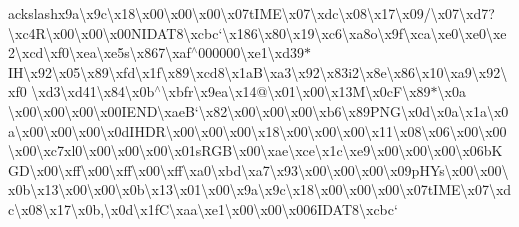ackslash{}x9a\textbackslash{}x9c\textbackslash{}x18\textbackslash{}x00\textbackslash{}x00\textbackslash{}x00\textbackslash{}x07t\+I\+M\+E\textbackslash{}x07\textbackslash{}xdc\textbackslash{}x08\textbackslash{}x17\textbackslash{}x09/\textbackslash{}x07\textbackslash{}xd7?\textbackslash{}xc4\+R\textbackslash{}x00\textbackslash{}x00\textbackslash{}x00\+N\+I\+D\+A\+T8\textbackslash{}xcbc`\textbackslash{}x186\textbackslash{}x80\textbackslash{}x19\textbackslash{}xc6\textbackslash{}xa8o\textbackslash{}x9f\textbackslash{}xca\textbackslash{}xe0\textbackslash{}xe0\textbackslash{}xe2\textbackslash{}xcd\textbackslash{}xf0\textbackslash{}xea\textbackslash{}xe5s\textbackslash{}x867\textbackslash{}xaf$^\wedge$000000\textbackslash{}xe1\textbackslash{}xd39$\ast$\+I\+H\textbackslash{}x92\textbackslash{}x05\textbackslash{}x89\textbackslash{}xfd\textbackslash{}x1f\textbackslash{}x89\textbackslash{}xcd8\textbackslash{}x1a\+B\textbackslash{}xa3\textbackslash{}x92\textbackslash{}x83\textquotesingle{}i2\textbackslash{}x8e\textbackslash{}x86\textbackslash{}x10\textbackslash{}xa9\textbackslash{}x92\textbackslash{}xf0 \textbackslash{}xd3\textbackslash{}xd41\textbackslash{}x84\textbackslash{}x0b$^\wedge$\textbackslash{}xbfr\textbackslash{}x9ea\textbackslash{}x14@\textbackslash{}x01\textbackslash{}x00\textbackslash{}x13\+M\textbackslash{}x0c\+F\textbackslash{}x89$\ast$\textbackslash{}x0a \textbackslash{}x00\textbackslash{}x00\textbackslash{}x00\textbackslash{}x00\+I\+E\+N\+D\textbackslash{}xae\+B`\textbackslash{}x82\textbackslash{}x00\textbackslash{}x00\textbackslash{}x00\textbackslash{}xb6\textbackslash{}x89\+P\+N\+G\textbackslash{}x0d\textbackslash{}x0a\textbackslash{}x1a\textbackslash{}x0a\textbackslash{}x00\textbackslash{}x00\textbackslash{}x00\textbackslash{}x0d\+I\+H\+D\+R\textbackslash{}x00\textbackslash{}x00\textbackslash{}x00\textbackslash{}x18\textbackslash{}x00\textbackslash{}x00\textbackslash{}x00\textbackslash{}x11\textbackslash{}x08\textbackslash{}x06\textbackslash{}x00\textbackslash{}x00\textbackslash{}x00\textbackslash{}xc7xl0\textbackslash{}x00\textbackslash{}x00\textbackslash{}x00\textbackslash{}x01s\+R\+G\+B\textbackslash{}x00\textbackslash{}xae\textbackslash{}xce\textbackslash{}x1c\textbackslash{}xe9\textbackslash{}x00\textbackslash{}x00\textbackslash{}x00\textbackslash{}x06b\+K\+G\+D\textbackslash{}x00\textbackslash{}xff\textbackslash{}x00\textbackslash{}xff\textbackslash{}x00\textbackslash{}xff\textbackslash{}xa0\textbackslash{}xbd\textbackslash{}xa7\textbackslash{}x93\textbackslash{}x00\textbackslash{}x00\textbackslash{}x00\textbackslash{}x09p\+H\+Ys\textbackslash{}x00\textbackslash{}x00\textbackslash{}x0b\textbackslash{}x13\textbackslash{}x00\textbackslash{}x00\textbackslash{}x0b\textbackslash{}x13\textbackslash{}x01\textbackslash{}x00\textbackslash{}x9a\textbackslash{}x9c\textbackslash{}x18\textbackslash{}x00\textbackslash{}x00\textbackslash{}x00\textbackslash{}x07t\+I\+M\+E\textbackslash{}x07\textbackslash{}xdc\textbackslash{}x08\textbackslash{}x17\textbackslash{}x0b,\textbackslash{}x0d\textbackslash{}x1f\+C\textbackslash{}xaa\textbackslash{}xe1\textbackslash{}x00\textbackslash{}x00\textbackslash{}x006\+I\+D\+A\+T8\textbackslash{}xcbc` 